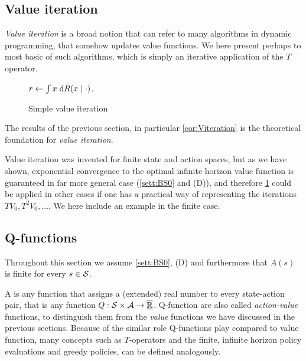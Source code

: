 \subsection{Value iteration}

\emph{Value iteration} is a broad notion that can refer to many algorithms
in dynamic programming, that somehow updates value functions.
We here present perhaps to most basic of such algorithms, which is simply
an iterative application of the $T$ operator.

\begin{figure}[H]
  \begin{algorithm}[H] %
    \caption{Simple value iteration}
    $r \leftarrow \int x \; \mathrm{d} R(x \mid \cdot)$.


  \label{alg:valueIteration}
  \end{algorithm}
\end{figure}

The results of the previous section, in particular \cref{cor:Viteration}
is the theoretical foundation for
\emph{value iteration}.

Value iteration was invented for finite state
and action spaces, but as we have shown, exponential convergence to the optimal
infinite horizon value function is guaranteed in far more general case
(\cref{sett:BS0} and (D)), and therefore \cref{alg:valueIteration} could be
applied in other cases if one has a practical way of representing the iterations
$TV_0, T^2V_0, \dots$.
We here include an example in the finite case.


\subsection{Q-functions}
Throughout this section we assume \cref{sett:BS0}, (D) and furthermore that
$A(s)$ is finite for every $s \in \mathcal{S}$.

A  is any function that assigns a (extended) real number
to every state-action pair, that is any function $Q : \mathcal{S} \times \mathcal{A}
\to \overline{\underline{\mathbb{R}}}$. Q-function are also called \emph{action-value} functions,
to distinguish them from the \emph{value} functions we have discussed in the
previous sections.
Because of the similar role Q-functions play compared to value function,
many concepts such as $T$-operators and the finite, infinite horizon
policy evaluations and greedy policies, can be defined analogously.

